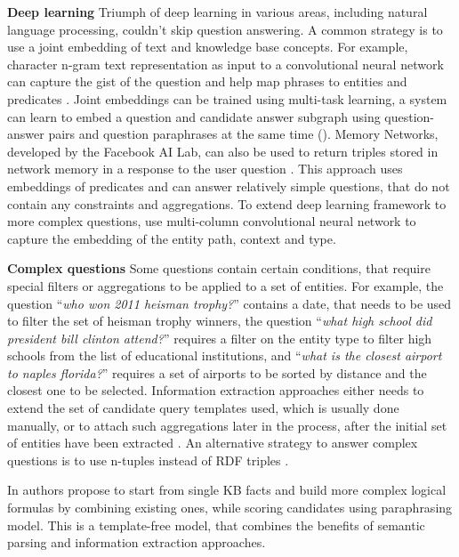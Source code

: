 \textbf{Deep learning}
Triumph of deep learning in various areas, including natural language processing, couldn't skip question answering.
A common strategy is to use a joint embedding of text and knowledge base concepts.
For example, character n-gram text representation as input to a convolutional neural network can capture the gist of the question and help map phrases to entities and predicates \cite{yih2014semantic}.
Joint embeddings can be trained using multi-task learning, \eg a system can learn to embed a question and candidate answer subgraph using question-answer pairs and question paraphrases at the same time (\cite{BordesCW14:emnlp}).
Memory Networks, developed by the Facebook AI Lab, can also be used to return triples stored in network memory in a response to the user question \cite{bordes2015large}.
This approach uses embeddings of predicates and can answer relatively simple questions, that do not contain any constraints and aggregations.
To extend deep learning framework to more complex questions, \cite{dong2015question} use multi-column convolutional neural network to capture the embedding of the entity path, context and type.

\textbf{Complex questions}
Some questions contain certain conditions, that require special filters or aggregations to be applied to a set of entities. 
For example, the question ``\textit{who won 2011 heisman trophy?}'' contains a date, that needs to be used to filter the set of heisman trophy winners, the question ``\textit{what high school did president bill clinton attend?}'' requires a filter on the entity type to filter high schools from the list of educational institutions, and ``\textit{what is the closest airport to naples florida?}'' requires a set of airports to be sorted by distance and the closest one to be selected.
Information extraction approaches either needs to extend the set of candidate query templates used, which is usually done manually, or to attach such aggregations later in the process, after the initial set of entities have been extracted \cite{yih:ACL:2015:STAGG}.
An alternative strategy to answer complex questions is to use n-tuples instead of RDF triples \cite{yin2015answering}.

In \cite{wang2015large} authors propose to start from single KB facts and build more complex logical formulas by combining existing ones, while scoring candidates using paraphrasing model.
This is a template-free model, that combines the benefits of semantic parsing and information extraction approaches.

